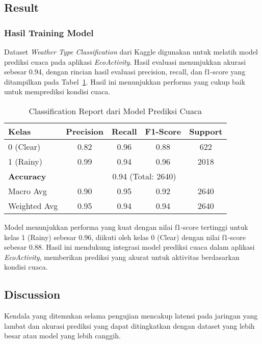 \documentclass[journal,article,submit,pdftex,moreauthors]{Definitions/mdpi}
\begin{document}
\subsection{Result}
\subsubsection{Hasil Training Model}
Dataset \textit{Weather Type Classification} dari Kaggle digunakan untuk melatih model prediksi cuaca pada aplikasi \textit{EcoActivity}. Hasil evaluasi menunjukkan akurasi sebesar 0.94, dengan rincian hasil evaluasi precision, recall, dan f1-score yang ditampilkan pada Tabel~\ref{tab:classification-report}. Hasil ini menunjukkan performa yang cukup baik untuk memprediksi kondisi cuaca.

\begin{table}[h]
    \centering
    \caption{Classification Report dari Model Prediksi Cuaca}
    \begin{tabular}{lcccc}
        \hline
        Kelas & Precision & Recall & F1-Score & Support \\
        \hline
        0 (Clear) & 0.82 & 0.96 & 0.88 & 622 \\
        1 (Rainy) & 0.99 & 0.94 & 0.96 & 2018 \\
        \hline
        \textbf{Accuracy} & \multicolumn{4}{c}{0.94 (Total: 2640)} \\
        Macro Avg & 0.90 & 0.95 & 0.92 & 2640 \\
        Weighted Avg & 0.95 & 0.94 & 0.94 & 2640 \\
        \hline
    \end{tabular}
    \label{tab:classification-report}
\end{table}
Model menunjukkan performa yang kuat dengan nilai f1-score tertinggi untuk kelas 1 (Rainy) sebesar 0.96, diikuti oleh kelas 0 (Clear) dengan nilai f1-score sebesar 0.88. Hasil ini mendukung integrasi model prediksi cuaca dalam aplikasi \textit{EcoActivity}, memberikan prediksi yang akurat untuk aktivitas berdasarkan kondisi cuaca.

\subsection{Discussion}
Kendala yang ditemukan selama pengujian mencakup latensi pada jaringan yang lambat dan akurasi prediksi yang dapat ditingkatkan dengan dataset yang lebih besar atau model yang lebih canggih.
\end{document}
